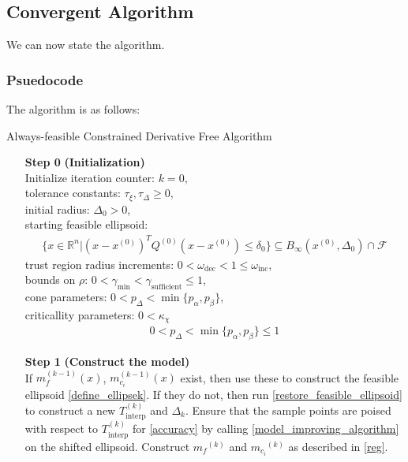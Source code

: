 \documentclass{article}
\theoremstyle{case}
\newcommand{\Rn}{\mathbb R^n}
\newcommand{\dk}{\Delta_k}
\newcommand{\mfk}{{{m}_f}^{(k)}}
\newcommand{\mcik}{{{m}_{c_i}}^{(k)}}
\newcommand{\tolcrit}{\tau_{\xi}}
\newcommand{\tolrad}{\tau_{\Delta}}
\newcommand{\sampletrk}{{T_{\text{interp}}^{(k)}}}
\newcommand{\feasible}{{\mathcal F}}
\newcommand{\omegainc}{\omega_{\text{inc}}}
\newcommand{\omegadec}{\omega_{\text{dec}}}
\newcommand{\gammasm}{\gamma_{\text{min}}}
\newcommand{\gammabi}{\gamma_{\text{sufficient}}}
\begin{document}
\subsection{Convergent Algorithm}

We can now state the algorithm.


\subsubsection{Psuedocode}
The algorithm is as follows:

\begin{algorithm}[H]
    \caption{Always-feasible Constrained Derivative Free Algorithm}
    \label{constrained_dfo}
    \begin{itemize}
        \item[\textbf{Step 0}] \textbf{(Initialization)} \\
        	Initialize iteration counter: $k=0$, \\
            tolerance constants: $\tolcrit, \tolrad \ge 0$, \\
            initial radius: $\Delta_0 > 0$, \\
            starting feasible ellipsoid: \begin{align}
            \{x \in\Rn | (x - x^{(0)})^T Q^{(0)} (x - x^{(0)}) \le \delta_0 \} \subseteq B_{\infty}\left(x^{(0)}, \Delta_{0}\right) \cap \feasible
            \end{align}
            trust region radius increments:
            $0 < \omegadec < 1 \le \omegainc$, \\
            bounds on $\rho$:
            $0 < \gammasm < \gammabi \le 1$, \\
            cone parameters:
            $0 < p_{\Delta} < \min\{p_{\alpha}, p_{\beta}\}$, \\
            criticallity parameters:
            $0 < \kappa_{\chi}$
\begin{align}
0 < p_{\Delta} < \min\{p_{\alpha}, p_{\beta}\} \le 1 \label{define_p_delta} 
\end{align}
            
        \item[\textbf{Step 1}] \textbf{(Construct the model)} \\
	    If $m_{f}^{(k-1)}(x)$, $m_{c_i}^{(k-1)}(x)$ exist, then use these to construct the feasible ellipsoid \cref{define_ellipsek}.
	    If they do not, then run \cref{restore_feasible_ellipsoid} to construct a new $\sampletrk$ and $\dk$.
            Ensure that the sample points are poised with respect to $ \sampletrk $ for \cref{accuracy} by calling \cref{model_improving_algorithm} on the shifted ellipsoid.
            Construct $\mfk$ and $\mcik$ as described in \cref{reg}.
        

\end{itemize}
\end{algorithm}
\end{document}
